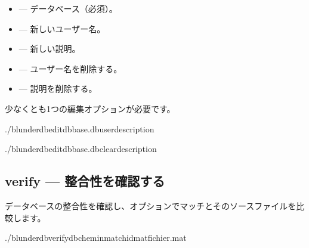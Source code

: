 \documentclass[letterpaper,10pt,dvipdfmx]{sphinxmanual}
\begin{document}
\sphinxAtStartPar
{}
\begin{itemize}
\item {} 
\sphinxAtStartPar
{} — データベース（必須）。

\item {} 
\sphinxAtStartPar
{} — 新しいユーザー名。

\item {} 
\sphinxAtStartPar
{} — 新しい説明。

\item {} 
\sphinxAtStartPar
{} — ユーザー名を削除する。

\item {} 
\sphinxAtStartPar
{} — 説明を削除する。

\end{itemize}

\sphinxAtStartPar
少なくとも1つの編集オプションが必要です。

\sphinxAtStartPar
{}

\begin{sphinxVerbatim}[commandchars=\\\{\}]
./blunderdbedit\PYGZhy{}\PYGZhy{}dbbase.db\PYGZhy{}\PYGZhy{}user\PYGZhy{}\PYGZhy{}description

./blunderdbedit\PYGZhy{}\PYGZhy{}dbbase.db\PYGZhy{}\PYGZhy{}clear\PYGZhy{}description
\end{sphinxVerbatim}


\subsection{verify — 整合性を確認する}
\label{\detokenize{cli:verify-verifier-l-integrite}}
\sphinxAtStartPar
データベースの整合性を確認し、オプションでマッチとそのソースファイルを比較します。

\begin{sphinxVerbatim}[commandchars=\\\{\}]
./blunderdbverify\PYGZhy{}\PYGZhy{}db\PYGZlt{}chemin\PYGZgt{}\PYG{o}{[}\PYGZhy{}\PYGZhy{}match\PYGZlt{}id\PYGZgt{}\PYG{o}{]}\PYG{o}{[}\PYGZhy{}\PYGZhy{}mat\PYGZlt{}fichier.mat\PYGZgt{}\PYG{o}{]}
\end{sphinxVerbatim}
\end{document}
